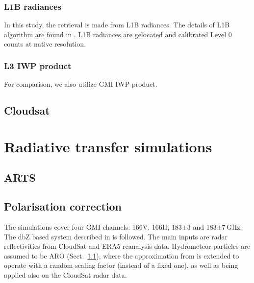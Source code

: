 \documentclass[amt, manuscript]{copernicus}
\begin{document}
\subsubsection{L1B radiances}

In this study, the retrieval is made from L1B radiances. The details of L1B algorithm are found in \citet{}. L1B radiances are gelocated and calibrated Level 0 counts at native resolution. 

\subsubsection{L3 IWP product}
For comparison, we also utilize GMI IWP product.  

\subsection{Cloudsat}


\section{Radiative transfer simulations}

\subsection{ARTS}
\label{sec:arts}

\subsection{Polarisation correction}
\label{sec:scaling_factor}
The simulations cover four GMI channels: 166V, 166H, 183$\pm$3
and 183$\pm$7\,GHz. The dbZ based
system described in \citet{ekelund:using:20} is followed. The
main inputs are radar reflectivities from CloudSat and ERA5 reanalysis data.
Hydrometeor particles are assumed to be ARO (Sect.~\ref{sec:arts}), where the
approximation from \citet{barlakas:intro:21} is extended to operate with 
a random scaling factor (instead of a fixed one), as well as being applied also
on the CloudSat radar data.
\end{document}
